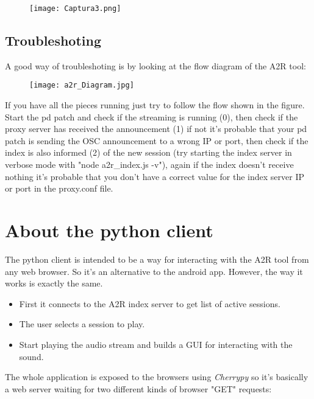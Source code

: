 \documentclass{article}
\begin{document}
\begin{figure}[htbp]
\centering
\texttt{[image: Captura3.png]}
\label{fig:capt3}
\end{figure}

\subsection{Troubleshoting}

A good way of troubleshoting is by looking at the flow diagram of the A2R tool:

\begin{figure}[htbp]
\centering
\texttt{[image: a2r\_Diagram.jpg]}
\label{fig:diagram}
\end{figure}

If you have all the pieces running just try to follow the flow shown in the figure. Start the pd patch and check if the streaming is running (0), then check if the proxy server has received the announcement (1) if not it's probable that your pd patch is sending the OSC announcement to a wrong IP or port, then check if the index is also informed (2) of the new session (try starting the index server in verbose mode with "node a2r\_index.js -v"), again if the index doesn't receive nothing it's probable that you don't have a correct value for the index server IP or port in the proxy.conf file.  \\



\section{About the python client}
The python client is intended to be a way for interacting with the A2R tool from any web browser. So it's an alternative to the android app. However, the way it works is exactly the same.

 \begin{itemize}
        \item{First it connects to the A2R index server to get list of active sessions.}
	\item{The user selects a session to play.}
	\item{Start playing the audio stream and builds a GUI for interacting with the sound. }
 \end{itemize}

The whole application is exposed to the browsers using \emph{Cherrypy} so it's basically a web server waiting for two different kinds of browser "GET" requests:
\end{document}
